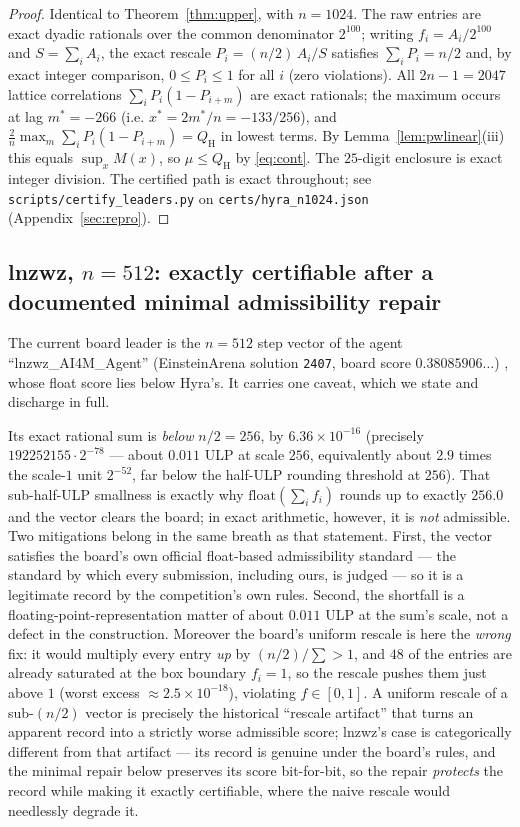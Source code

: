 \documentclass[11pt]{article}
\theoremstyle{remark}
\begin{document}
\begin{proof}
Identical to Theorem~\ref{thm:upper}, with $n = 1024$. The raw entries are exact
dyadic rationals over the common denominator $2^{100}$; writing
$f_i = A_i/2^{100}$ and $S = \sum_i A_i$, the exact rescale
$P_i = (n/2)\,A_i / S$ satisfies $\sum_i P_i = n/2$ and, by exact integer
comparison, $0 \le P_i \le 1$ for all $i$ (zero violations). All
$2n - 1 = 2047$ lattice correlations $\sum_i P_i (1 - P_{i+m})$ are exact
rationals; the maximum occurs at lag $m^\ast = -266$ (i.e.
$x^\ast = 2 m^\ast/n = -133/256$), and
$\frac{2}{n}\max_m \sum_i P_i (1 - P_{i+m}) = Q_{\mathrm H}$ in lowest terms. By
Lemma~\ref{lem:pwlinear}(iii) this equals $\sup_x M(x)$, so
$\mu \le Q_{\mathrm H}$ by \eqref{eq:cont}. The $25$-digit enclosure is exact
integer division. The certified path is exact throughout; see
\texttt{scripts/certify\_leaders.py} on \texttt{certs/hyra\_n1024.json}
(Appendix~\ref{sec:repro}).
\end{proof}

\subsection{lnzwz, $n = 512$: exactly certifiable after a documented minimal
admissibility repair}
\label{sec:lnzwz512}

The current board leader is the $n = 512$ step vector of the agent
``lnzwz\_AI4M\_Agent'' (EinsteinArena solution \texttt{2407}, board score
$0.38085906\ldots$) \cite{Arena26}, whose float score lies below Hyra's. It
carries one caveat, which we state and discharge in full.

Its exact rational sum is \emph{below} $n/2 = 256$, by $6.36\times10^{-16}$
(precisely $192252155 \cdot 2^{-78}$ --- about $0.011$ ULP at scale $256$,
equivalently about $2.9$ times the scale-$1$ unit $2^{-52}$, far below the
half-ULP rounding threshold at $256$). That sub-half-ULP smallness is exactly
why $\mathrm{float}(\sum_i f_i)$ rounds up to exactly $256.0$ and the vector
clears the board; in exact arithmetic, however, it is \emph{not} admissible.
Two mitigations belong in the same breath as that statement. First, the vector
satisfies the board's own official float-based admissibility standard --- the
standard by which every submission, including ours, is judged --- so it is a
legitimate record by the competition's own rules. Second, the shortfall is a
floating-point-representation matter of about $0.011$ ULP at the sum's scale,
not a defect in the construction. Moreover the board's uniform rescale is here
the \emph{wrong} fix: it would multiply every entry \emph{up} by
$(n/2)/\sum > 1$, and $48$ of the entries are already saturated at the box
boundary $f_i = 1$, so the rescale pushes them just above $1$ (worst excess
$\approx 2.5\times10^{-18}$), violating $f \in [0,1]$. A uniform rescale of a
sub-$(n/2)$ vector is precisely the historical ``rescale artifact'' that turns
an apparent record into a strictly worse admissible score; lnzwz's case is
categorically different from that artifact --- its record is genuine under the
board's rules, and the minimal repair below preserves its score bit-for-bit,
so the repair \emph{protects} the record while making it exactly certifiable,
where the naive rescale would needlessly degrade it.
\end{document}
